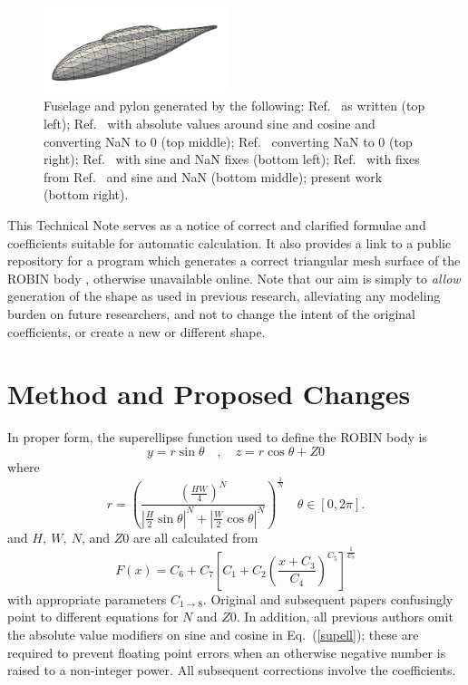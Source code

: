 \documentclass[journal]{new-aiaa}
\begin{document}
\begin{figure}[b]
\begin{centering}
\includegraphics[width=2.1in]{img_figg.png}
\caption{Fuselage and pylon generated by the following: Ref.~\cite{nasa80051} as written (top left); Ref.~\cite{nasa80051} with absolute values around sine and cosine and converting NaN to 0 (top middle); Ref.~\cite{nasa87762} converting NaN to 0 (top right); Ref.~\cite{nasa87762} with sine and NaN fixes (bottom left); Ref.~\cite{mineckgorton} with fixes from Ref.~\cite{nasa87762} and sine and NaN (bottom middle); present work (bottom right).}
\label{allforms}
\end{centering}\end{figure}%
This Technical Note serves as a notice of correct and clarified formulae and coefficients
suitable for automatic calculation.
It also provides a link to a public repository for a program which generates a correct
triangular mesh surface of the ROBIN body \cite{robinsurfmesh}, otherwise unavailable online.
Note that our aim is simply to \emph{allow} generation of the shape as used in previous research,
alleviating any modeling burden on future researchers,
and not to change the intent of the original coefficients, or create a new or different shape.


\section{Method and Proposed Changes}
In proper form, the superellipse function used to define the ROBIN body is
\begin{equation}
   y=r \sin \theta \quad , \quad z=r \cos \theta +Z0
\end{equation} 
where
\begin{equation}
  r=\left(\frac{\left(\frac{HW}{4}\right)^{N}}{|\frac{H}{2}\sin \theta|^{N}+|\frac{W}{2}\cos \theta|^{N}}\right)^{\frac{1}{N}} \quad \theta\in[0,2\pi].
\label{supell}
\end{equation}
and $H, \ W, \ N$, and $Z0$ are all calculated from
\begin{equation}
  F\!\left(x\right) = C_{6}+C_{7}\left[C_{1}+C_{2}\left(\frac{x+C_{3}}{C_{4}}\right)^{C_{5}}\right]^{\frac{1}{C_{8}}}
\label{coeff}
\end{equation}
with appropriate parameters $C_{1 \to 8}$.
Original \cite{nasa80051} and subsequent \cite{nasa87762} papers confusingly point to different equations
for $N$ and $Z0$.
In addition, all previous authors omit the absolute value modifiers on sine and cosine in Eq.~(\ref{supell}); these are
required to prevent floating point errors when an otherwise negative number is raised to a non-integer power.  
All subsequent corrections involve the coefficients.
\end{document}
